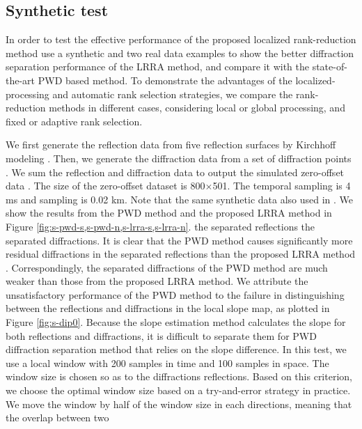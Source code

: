 \subsection{Synthetic test}
In order to test the effective performance of the proposed localized rank-reduction method use a synthetic and two real data examples to show the better diffraction separation performance of the LRRA method, and compare it with the state-of-the-art PWD based method. To demonstrate the advantages of the localized-processing and automatic rank selection strategies, we compare the rank-reduction methods in different cases, considering local or global processing, and fixed or adaptive rank selection.

 We first generate the reflection data from five reflection surfaces by Kirchhoff modeling . Then, we generate the diffraction data from a set of diffraction points . We sum the reflection and diffraction data to output the simulated zero-offset data . The size of the zero-offset dataset is 800$\times$501. The temporal sampling is 4 ms and  sampling is 0.02 km. Note that the same synthetic data  also used in \cite{merzlikin2019least}. We show the results from the PWD method \cite[]{fomel2007} and the proposed LRRA method in Figure \ref{fig:s-pwd-s,s-pwd-n,s-lrra-s,s-lrra-n}.  the separated reflections the separated diffractions. It is clear that the PWD method  causes significantly more residual diffractions in the separated reflections than the proposed LRRA method . Correspondingly, the separated diffractions of the PWD method are much weaker than those from the proposed LRRA method. We attribute the unsatisfactory performance of the PWD method to the failure in distinguishing between the reflections and diffractions in the local slope map, as plotted in Figure \ref{fig:s-dip0}. Because the slope estimation method calculates the slope for both reflections and diffractions, it is difficult to separate them for PWD diffraction separation method that relies on the slope difference. In this test, we use a local window with 200 samples in time and 100 samples in space. The window size is chosen so as to  the  diffractions reflections. Based on this criterion, we choose the optimal window size based on a try-and-error strategy in practice. We move the window by half of the window size in each directions, meaning that the overlap between two 